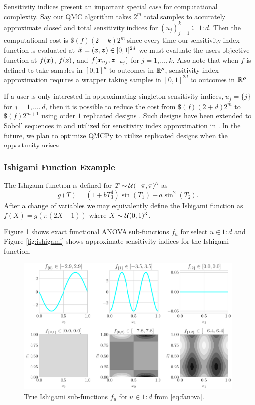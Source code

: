 \documentclass{article}[12pt]
\begin{document}
Sensitivity indices present an important special case for computational complexity. Say our QMC algorithm takes $2^m$ total samples to accurately approximate closed and total sensitivity indices for $(u_j)_{j=1}^k \subseteq 1:d$. Then the computational cost is $\$(f)(2+k)2^m$ since every time our sensitivity index function is evaluated at $\tilde{\boldsymbol{x}} = (\boldsymbol{x},\boldsymbol{z}) \in [0,1]^{2d}$ we must evaluate the users objective function at $f(\boldsymbol{x})$, $f(\boldsymbol{z})$, and $f(\boldsymbol{x}_{u_j},\boldsymbol{z}_{-{u_j}})$ for $j=1,\dots,k$. Also note that when $f$ is defined to take samples in  $[0,1]^d$ to outcomes in $\mathbb{R}^{\tilde{\boldsymbol{\rho}}}$, sensitivity index approximation requires a wrapper taking samples in $[0,1]^{2d}$ to outcomes in $\mathbb{R}^{\boldsymbol{\rho}}$

If a user is only interested in approximating singleton sensitivity indices, $u_j = \{j\}$ for $j=1,\dots,d$, then it is possible to reduce the cost from $\$(f)(2+d)2^m$ to $\$(f)2^{m+1}$ using order $1$ replicated designs \cite{alex2008comparison,tissot2015randomized}. Such designs have been extended to  Sobol' sequences  in \cite{replicated_designs_sobol_seq} and utilized for sensitivity index approximation in \cite{reliable_sobol_indices_approx}. In the future, we plan to optimize QMCPy to utilize replicated designs when the opportunity arises.

\subsubsection{Ishigami Function Example}

The Ishigami function \cite{ishigami1990importance} is defined for $T \sim \mathcal{U}(-\pi,\pi)^3$ as
\begin{equation*}
    g(T) = \left(1+bT_3^4\right)\sin(T_1) + a\sin^2(T_2).
\end{equation*}
After a change of variables we may equivalently define the Ishigami function as 
$f(X) = g\left(\pi(2X-1)\right)$ where $X \sim \mathcal{U}(0,1)^3$. 

Figure \ref{fig:ishigami_fu} shows exact functional ANOVA sub-functions $f_u$ for select $u \in 1:d$ and Figure \ref{fig:ishigami} shows approximate sensitivity indices for the Ishigami function. 

\begin{figure}[H]
    \centering
    \includegraphics[width=.8\textwidth]{figs/ishigami_fu.pdf}
    \caption{True Ishigami sub-functions $f_u$ for $u \in 1:d$ from \eqref{eq:fanova}.}
    \label{fig:ishigami_fu}
\end{figure}
\end{document}
